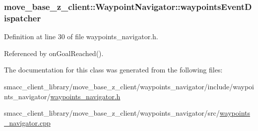 \subsubsection[{\texorpdfstring{waypoints\+Event\+Dispatcher}{waypointsEventDispatcher}}]{ move\+\_\+base\+\_\+z\+\_\+client\+::\+Waypoint\+Navigator\+::waypoints\+Event\+Dispatcher}\hypertarget{classmove__base__z__client_1_1WaypointNavigator_a488a89db6cd20bc12548ac454254829f}{}\label{classmove__base__z__client_1_1WaypointNavigator_a488a89db6cd20bc12548ac454254829f}


Definition at line 30 of file waypoints\+\_\+navigator.\+h.



Referenced by on\+Goal\+Reached().



The documentation for this class was generated from the following files\+:\begin{DoxyCompactItemize}
\item 
smacc\+\_\+client\+\_\+library/move\+\_\+base\+\_\+z\+\_\+client/waypoints\+\_\+navigator/include/waypoints\+\_\+navigator/\hyperlink{waypoints__navigator_8h}{waypoints\+\_\+navigator.\+h}\item 
smacc\+\_\+client\+\_\+library/move\+\_\+base\+\_\+z\+\_\+client/waypoints\+\_\+navigator/src/\hyperlink{waypoints__navigator_8cpp}{waypoints\+\_\+navigator.\+cpp}\end{DoxyCompactItemize}
